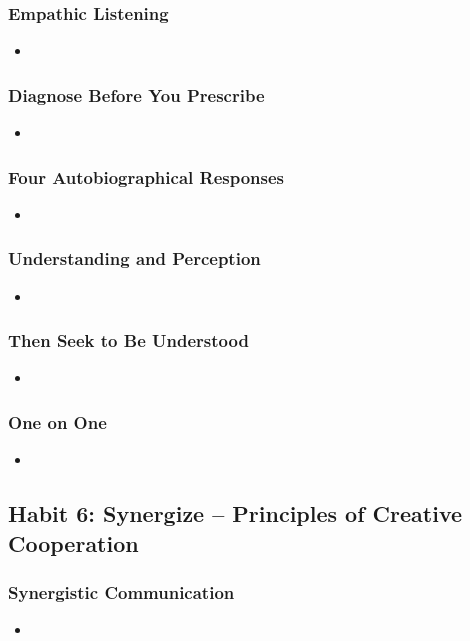 \documentclass[11pt]{article}
\begin{document}
\subsubsection{Empathic Listening}
\begin{itemize}
\item 
\end{itemize}
\subsubsection{Diagnose Before You Prescribe}
\begin{itemize}
\item 
\end{itemize}
\subsubsection{Four Autobiographical Responses}
\begin{itemize}
\item 
\end{itemize}
\subsubsection{Understanding and Perception}
\begin{itemize}
\item 
\end{itemize}
\subsubsection{Then Seek to Be Understood}
\begin{itemize}
\item 
\end{itemize}
\subsubsection{One on One}
\begin{itemize}
\item 
\end{itemize}
\subsection{Habit 6: Synergize -- Principles of Creative Cooperation}
\subsubsection{Synergistic Communication}
\begin{itemize}
\item 
\end{itemize}
\end{document}
